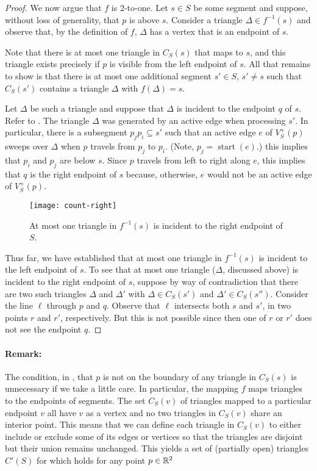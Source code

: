 \documentclass{patmorin}
\DeclareMathOperator{\start}{start}
\begin{document}
\begin{proof}
We now argue that $f$ is 2-to-one.  Let $s\in S$ be some segment and
suppose, without loss of generality, that $p$ is above $s$.  Consider a
triangle $\Delta \in f^{-1}(s)$ and observe that, by the definition of $f$,
$\Delta$ has a vertex that is an endpoint of $s$.

Note that there is at most one triangle in $C_S(s)$ that maps to $s$, and
this triangle exists precisely if $p$ is visible from the left endpoint of
$s$.  All that remains to show is that there is at most one additional
segment $s'\in S$, $s'\neq s$ such that $C_S(s')$ contains a triangle
$\Delta$ with $f(\Delta)=s$.

Let $\Delta$ be such a triangle and suppose that $\Delta$ is incident to
the endpoint $q$ of $s$.  Refer to .  The triangle
$\Delta$ was generated by an active edge when processing $s'$.  In
particular, there is a subsegment $p_j p_i\subseteq s'$ such that an active
edge $e$ of $V^+_S(p)$ sweeps over $\Delta$ when $p$ travels from $p_j$ to
$p_i$. (Note, $p_j=\start(e)$.) this implies that $p_i$ and $p_j$ are below
$s$. Since $p$ travels from left to right along $e$, this implies that $q$
is the right endpoint of $s$ because, otherwise, $e$ would not be an active
edge of $V^+_S(p)$.

\begin{figure}
  \begin{center}
    \texttt{[image: count-right]}
  \end{center}
  \caption{At most one triangle in $f^{-1}(s)$ is incident to the right
           endpoint of $S$.}
\end{figure}

Thus far, we have established that at most one triangle in $f^{-1}(s)$ is
incident to the left endpoint of $s$.  To see that at most one triangle
($\Delta$, discussed above) is incident to the right endpoint of $s$,
suppose by way of contradiction that there are two such triangles $\Delta$
and $\Delta'$ with $\Delta\in C_S(s')$ and $\Delta'\in C_S(s'')$.
Consider the line $\ell$ through $p$ and $q$.  Observe that $\ell$
intersects both $s$ and $s'$, in two points $r$ and $r'$, respectively. But
this is not possible since then one of $r$ or $r'$ does not see the
endpoint $q$.
\end{proof}

\paragraph{Remark:}
The condition, in , that $p$ is not on the boundary of
any triangle in $C_S(s)$ is unnecessary if we take a little care.
In particular, the mapping $f$ maps triangles to the endpoints of
segments.  The set $C_S(v)$ of triangles mapped to a particular endpoint
$v$ all have $v$ as a vertex and no two triangles in $C_S(v)$ share an
interior point.  This means that we can define each triangle in $C_S(v)$
to either include or exclude some of its edges or vertices so that the
triangles are disjoint but their union remains unchanged. This yields
a set of (partially open) triangles $C'(S)$ for which 
holds for any point $p\in\mathbb{R}^2$
\end{document}
